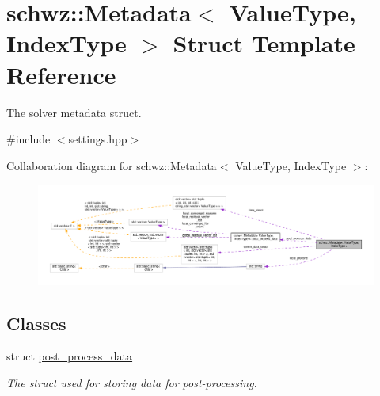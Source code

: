 \hypertarget{structschwz_1_1Metadata}{}\section{schwz\+:\+:Metadata$<$ Value\+Type, Index\+Type $>$ Struct Template Reference}
\label{structschwz_1_1Metadata}


The solver metadata struct.  




{\ttfamily \#include $<$settings.\+hpp$>$}



Collaboration diagram for schwz\+:\+:Metadata$<$ Value\+Type, Index\+Type $>$\+:
\nopagebreak
\begin{figure}[H]
\begin{center}
\leavevmode
\includegraphics[width=350pt]{structschwz_1_1Metadata__coll__graph}
\end{center}
\end{figure}
\subsection*{Classes}
\begin{DoxyCompactItemize}
\item 
struct \hyperlink{structschwz_1_1Metadata_1_1post__process__data}{post\+\_\+process\+\_\+data}
\begin{DoxyCompactList}\small\item\em The struct used for storing data for post-\/processing. \end{DoxyCompactList}\end{DoxyCompactItemize}
